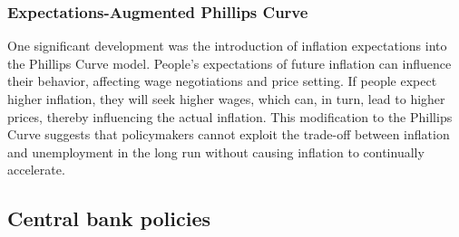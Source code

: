 \documentclass{report}
\begin{document}
     \bigbreak \noindent 
     \subsubsection{Expectations-Augmented Phillips Curve}
     \bigbreak \noindent 
  One significant development was the introduction of inflation expectations into the Phillips Curve model. People's expectations of future inflation can influence their behavior, affecting wage negotiations and price setting. If people expect higher inflation, they will seek higher wages, which can, in turn, lead to higher prices, thereby influencing the actual inflation. This modification to the Phillips Curve suggests that policymakers cannot exploit the trade-off between inflation and unemployment in the long run without causing inflation to continually accelerate.

  \bigbreak \noindent 
  \subsection{Central bank policies}
  \bigbreak \noindent 











     

     \pagebreak 

     \pagebreak 

     \pagebreak 

     \pagebreak 

     \pagebreak 
\end{document}
